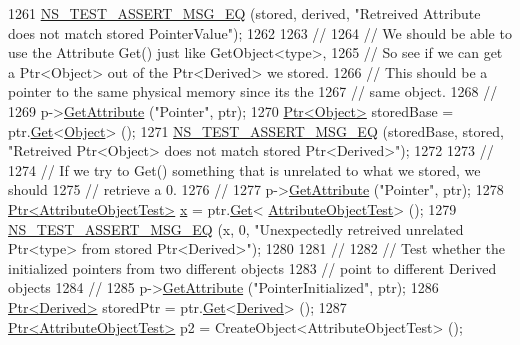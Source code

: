 \begin{DoxyCode}
1261   \hyperlink{group__testing_ga2a9d78cffb3db8e867c35fff0b698cf5}{NS\_TEST\_ASSERT\_MSG\_EQ} (stored, derived, \textcolor{stringliteral}{"Retreived Attribute does not match stored
       PointerValue"});
1262 
1263   \textcolor{comment}{//}
1264   \textcolor{comment}{// We should be able to use the Attribute Get() just like GetObject<type>,}
1265   \textcolor{comment}{// So see if we can get a Ptr<Object> out of the Ptr<Derived> we stored.}
1266   \textcolor{comment}{// This should be a pointer to the same physical memory since its the }
1267   \textcolor{comment}{// same object.}
1268   \textcolor{comment}{//}
1269   p->\hyperlink{classns3_1_1ObjectBase_a895d1de2f96063d0e0fd78463e7a7e30}{GetAttribute} (\textcolor{stringliteral}{"Pointer"}, ptr);
1270   \hyperlink{classns3_1_1Ptr}{Ptr<Object>} storedBase = ptr.\hyperlink{classns3_1_1PointerValue_ae8e90fe3c0810cd6e4e1b1ba31f52a66}{Get}<\hyperlink{classns3_1_1Object}{Object}> ();
1271   \hyperlink{group__testing_ga2a9d78cffb3db8e867c35fff0b698cf5}{NS\_TEST\_ASSERT\_MSG\_EQ} (storedBase, stored, \textcolor{stringliteral}{"Retreived Ptr<Object> does not match
       stored Ptr<Derived>"});
1272 
1273   \textcolor{comment}{//}
1274   \textcolor{comment}{// If we try to Get() something that is unrelated to what we stored, we should}
1275   \textcolor{comment}{// retrieve a 0.}
1276   \textcolor{comment}{//}
1277   p->\hyperlink{classns3_1_1ObjectBase_a895d1de2f96063d0e0fd78463e7a7e30}{GetAttribute} (\textcolor{stringliteral}{"Pointer"}, ptr);
1278   \hyperlink{classns3_1_1Ptr}{Ptr<AttributeObjectTest>} \hyperlink{lte__link__budget__x2__handover__measures_8m_a9336ebf25087d91c818ee6e9ec29f8c1}{x} = ptr.\hyperlink{classns3_1_1PointerValue_ae8e90fe3c0810cd6e4e1b1ba31f52a66}{Get}<
      \hyperlink{classAttributeObjectTest}{AttributeObjectTest}> ();
1279   \hyperlink{group__testing_ga2a9d78cffb3db8e867c35fff0b698cf5}{NS\_TEST\_ASSERT\_MSG\_EQ} (x, 0, \textcolor{stringliteral}{"Unexpectedly retreived unrelated Ptr<type> from stored
       Ptr<Derived>"});
1280 
1281   \textcolor{comment}{//}
1282   \textcolor{comment}{// Test whether the initialized pointers from two different objects}
1283   \textcolor{comment}{// point to different Derived objects}
1284   \textcolor{comment}{//}
1285   p->\hyperlink{classns3_1_1ObjectBase_a895d1de2f96063d0e0fd78463e7a7e30}{GetAttribute} (\textcolor{stringliteral}{"PointerInitialized"}, ptr);
1286   \hyperlink{classns3_1_1Ptr}{Ptr<Derived>} storedPtr = ptr.\hyperlink{classns3_1_1PointerValue_ae8e90fe3c0810cd6e4e1b1ba31f52a66}{Get}<\hyperlink{classDerived}{Derived}> ();
1287   \hyperlink{classns3_1_1Ptr}{Ptr<AttributeObjectTest>} p2 = CreateObject<AttributeObjectTest> ();

\end{DoxyCode}

